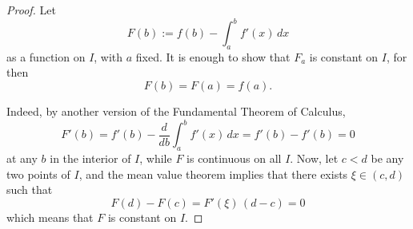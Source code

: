 

\begin{proof}

Let 
$$
F(b) := f(b) - \int_a^b f'(x)\,dx 
$$
as a function on $I$, with $a$ fixed. It is enough to 
show that $F_a$ is constant on $I$, for then 
$$
F(b) = F(a) = f(a).
$$

Indeed, by another version of the Fundamental Theorem of Calculus,
$$
F'(b) = f'(b) - \frac{d}{db}\int_a^b f'(x)\, dx = f'(b) - f'(b) = 0
$$
at any $b$ in the interior of $I$, while $F$ is continuous on all $I$. 
Now, let $c<d$ be any two points of $I$, and the mean value theorem 
implies that there exists $\xi\in (c,d)$ such that
$$
F(d) - F(c) = F'(\xi)\, (d-c) = 0
$$
which means that $F$ is constant on $I$.

\end{proof}

